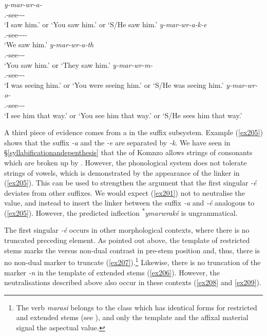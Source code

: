 \begin{exe}
\ex
\begin{xlist}
	\ex
	\gll \emph{y-mar-wr-a-\Zero{}}\\
	\Tsg.\Masc-see-\Ndu-\Pst-\Sg\\
	\trans `I saw him.' or `You saw him.' or `S/He saw him.'
	\label{ex201}
	\ex
	\gll \emph{y-mar-wr-a-k-e}\\
	\Tsg.\Masc-see-\Ndu-\Pst-\Lk-\Fnsg\\
	\trans `We saw him.'
	\label{ex205}
	\ex
	\gll \emph{y-mar-wr-a-th}\\
	\Tsg.\Masc-see-\Ndu-\Pst-\Stnsg\\
	\trans `You saw him.' or `They saw him.'
	\label{ex203}
	\ex
	\gll \emph{y-mar-wr-m-\Zero{}}\\
	\Tsg.\Masc-see-\Ndu-\Dur-\Sg\\
	\trans `I was seeing him.' or `You were seeing him.' or `S/He was seeing him.'
	\label{ex202}
	\ex
	\gll \emph{y-mar-wr-o-\Zero{}}\\
	\Tsg.\Masc-see-\Ndu-\Andat-\Sg\\
	\trans `I see him that way.' or `You see him that way.' or `S/He sees him that way.'
	\label{ex214}
\end{xlist}
\end{exe}

A third piece of evidence comes from a  in the suffix subsystem. Example (\ref{ex205}) shows that the  suffix \emph{-a} and the {\Fnsg} \emph{-e} are separated by \emph{-k}. We have seen in {\S}\ref{syllabificationandepenthesis} that the  of Komnzo allows strings of consonants which are broken up by . However, the phonological system does not tolerate strings of vowels, which is demonstrated by the appearance of the linker in (\ref{ex205}). This can be used to strengthen the argument that the first singular \emph{-é} deviates from other suffixes. We would expect (\ref{ex201}) not to neutralise the  value, and instead to insert the linker between the  suffix \emph{-a} and \emph{-é} analogous to (\ref{ex205}). However, the predicted inflection \textsuperscript{$\ast$}\emph{ymarwraké} is ungrammatical.

The first singular \emph{-é} occurs in other morphological contexts, where there is no truncated preceding element. As pointed out above, the template of restricted stems marks the  versus non-dual contrast in pre-stem position and, thus, there is no non-dual marker to truncate (\ref{ex207}).\footnote{The verb \emph{marasi} belongs to the class which has identical forms for restricted and extended stems (see ), and only the template and the affixal material signal the aspectual value.} Likewise, there is no truncation of the  marker \emph{-n} in the template of extended stems (\ref{ex206}). However, the  neutralisations described above also occur in these contexts (\ref{ex208} and \ref{ex209}).

